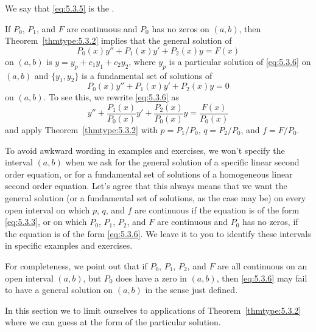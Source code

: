 \documentclass{ximera}
\begin{document}
We say that \eqref{eq:5.3.5} is the .


If $P_0$, $P_1$, and $F$ are continuous and $P_0$ has no zeros on
$(a,b)$, then  Theorem~\ref{thmtype:5.3.2} implies that the general
solution of
\begin{equation} \label{eq:5.3.6}
P_0(x)y''+P_1(x)y'+P_2(x)y=F(x)
\end{equation}
on  $(a,b)$ is $y=y_p+c_1y_1+c_2y_2$, where $y_p$ is a particular
solution  of \eqref{eq:5.3.6} on $(a,b)$ and  $\{y_1,y_2\}$ is a
fundamental set of solutions of
$$
P_0(x)y''+P_1(x)y'+P_2(x)y=0
$$
on $(a,b)$. To see this, we rewrite \eqref{eq:5.3.6} as
$$
y''+\frac{P_1(x)}{P_0(x)}y'+\frac{P_2(x)}{P_0(x)}y=\frac{F(x)}{P_0(x)}
$$
and apply Theorem~\ref{thmtype:5.3.2} with $p=P_1/P_0$, $q=P_2/P_0$, and
$f=F/P_0$.


To avoid awkward wording in examples and exercises, we won't specify
the interval $(a,b)$ when we ask for the general solution of a
specific linear second order equation, or for a fundamental set of
solutions of a homogeneous linear second order equation. Let's agree
that this always means that we want the general solution (or a
fundamental set of solutions, as the case may be) on every open
interval on which $p$, $q$, and $f$ are continuous if the equation is
of the form \eqref{eq:5.3.3}, or on which $P_0$, $P_1$, $P_2$, and $F$ are
continuous and $P_0$ has no zeros, if the equation is of the form
\eqref{eq:5.3.6}. We leave it to you to identify these intervals in
specific examples and exercises.

For completeness, we point out that if $P_0$, $P_1$, $P_2$, and $F$ are
all continuous on an open interval $(a,b)$, but $P_0$  does
have a zero in $(a,b)$, then \eqref{eq:5.3.6} may fail to have a general
solution on $(a,b)$ in the sense just defined.

In this section we to limit ourselves to applications of
Theorem~\ref{thmtype:5.3.2} where we can guess at the form of the
particular solution.
\end{document}
